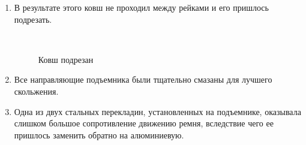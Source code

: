 \begin{enumerate}
	\item В результате этого ковш не проходил между рейками и его пришлось подрезать.
	\begin{figure}[H]
		\begin{minipage}[h]{0.2\linewidth}
			\center  
		\end{minipage}
		\begin{minipage}[h]{0.6\linewidth}
			\caption{Ковш подрезан}
		\end{minipage}
	\end{figure}
	
	\item Все направляющие подъемника были тщательно смазаны для лучшего скольжения.
	
	\item Одна из двух стальных перекладин, установленных на подъемнике, оказывала слишком большое сопротивление движению ремня, вследствие чего ее пришлось заменить обратно на алюминиевую.
	

\end{enumerate}
